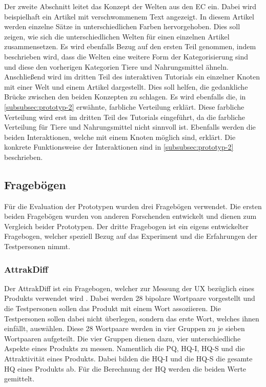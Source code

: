 Der zweite Abschnitt leitet das Konzept der Welten aus den \ac{EC} ein.
Dabei wird beispielhaft ein Artikel mit verschwommenem Text angezeigt.
In diesem Artikel werden einzelne Sätze in unterschiedlichen Farben hervorgehoben.
Dies soll zeigen, wie sich die unterschiedlichen Welten für einen einzelnen Artikel zusammensetzen.
Es wird ebenfalls Bezug auf den ersten Teil genommen, indem beschrieben wird, dass die Welten eine weitere Form der Kategorisierung sind und diese den vorherigen Kategorien Tiere und Nahrungsmittel ähneln.\\

Anschließend wird im dritten Teil des interaktiven Tutorials ein einzelner Knoten mit einer Welt und einem Artikel dargestellt.
Dies soll helfen, die gedankliche Brücke zwischen den beiden Konzepten zu schlagen.
Es wird ebenfalls die, in \autoref{subsubsec:prototyp-2} erwähnte, farbliche Verteilung erklärt.
Diese farbliche Verteilung wird erst im dritten Teil des Tutorials eingeführt, da die farbliche Verteilung für Tiere und Nahrungsmittel nicht sinnvoll ist.
Ebenfalls werden die beiden Interaktionen, welche mit einem Knoten möglich sind, erklärt.
Die konkrete Funktionsweise der Interaktionen sind in \autoref{subsubsec:prototyp-2} beschrieben.\\

\subsection{Fragebögen}
Für die Evaluation der Prototypen wurden drei Fragebögen verwendet.
Die ersten beiden Fragebögen wurden von anderen Forschenden entwickelt und dienen zum Vergleich beider Prototypen.
Der dritte Fragebogen ist ein eigens entwickelter Fragebogen, welcher speziell Bezug auf das Experiment und die Erfahrungen der Testpersonen nimmt.\\

\subsubsection{AttrakDiff}
Der AttrakDiff ist ein Fragebogen, welcher zur Messung der \ac{UX} bezüglich eines Produkts verwendet wird \cite{attrakdiff-2000, attrakdiff-2003, attrakdiff-2008}.
Dabei werden 28 bipolare Wortpaare vorgestellt und die Testpersonen sollen das Produkt mit einem Wort assoziieren.
Die Testpersonen sollen dabei nicht überlegen, sondern das erste Wort, welches ihnen einfällt, auswählen.
Diese 28 Wortpaare werden in vier Gruppen zu je sieben Wortpaaren aufgeteilt.
Die vier Gruppen dienen dazu, vier unterschiedliche Aspekte eines Produkts zu messen.
Namentlich die \ac{PQ}, \ac{HQ-I}, \ac{HQ-S} und die Attraktivität eines Produkts.
Dabei bilden die \ac{HQ-I} und die \ac{HQ-S} die gesamte \ac{HQ} eines Produkts ab.
Für die Berechnung der \ac{HQ} werden die beiden Werte gemittelt. \\

